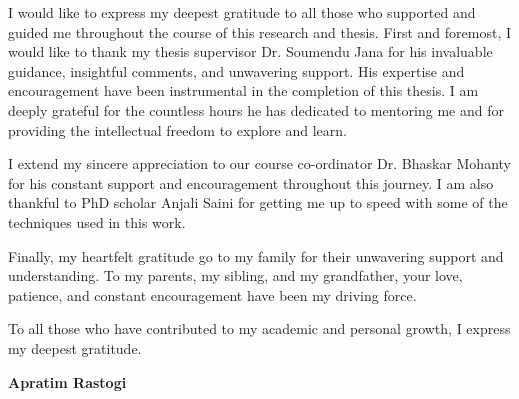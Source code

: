I would like to express my deepest gratitude to all those who supported and 
guided me throughout the course of this research and thesis.
First and foremost, I would like to thank my thesis supervisor Dr. Soumendu Jana for his invaluable guidance, insightful comments, and unwavering support. 
His expertise and encouragement have been instrumental in the completion of this thesis. I am deeply grateful for the countless hours he has dedicated to mentoring me and for providing the intellectual freedom to explore and learn.

I extend my sincere appreciation to our course co-ordinator Dr. Bhaskar Mohanty for his constant support and encouragement throughout this journey. 
I am also thankful to PhD scholar Anjali Saini for getting me up to speed with some of the techniques used in this work.

Finally, my heartfelt gratitude go to my family for their unwavering support and understanding. To my parents, my sibling, and my grandfather, your love, patience, and constant encouragement have been my driving force.

To all those who have contributed to my academic and personal growth, I express my deepest gratitude. 

\vspace*{20pt}
\hfill {\bf Apratim Rastogi}

